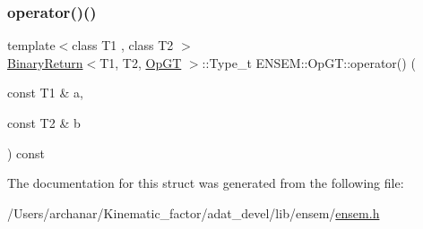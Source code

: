 \mbox{\label{structENSEM_1_1OpGT_acc420fbf856bae16d2db09a4c622ff4f}} 
\subsubsection{\texorpdfstring{operator()()}{operator()()}\hspace{0.1cm}{\footnotesize\ttfamily [2/2]}}
{\footnotesize\ttfamily template$<$class T1 , class T2 $>$ \\
\mbox{\hyperlink{structENSEM_1_1BinaryReturn}{Binary\+Return}}$<$T1, T2, \mbox{\hyperlink{structENSEM_1_1OpGT}{Op\+GT}} $>$\+::Type\+\_\+t E\+N\+S\+E\+M\+::\+Op\+G\+T\+::operator() (\begin{DoxyParamCaption}\item[{const T1 \&}]{a,  }\item[{const T2 \&}]{b }\end{DoxyParamCaption}) const\hspace{0.3cm}{\ttfamily [inline]}}



The documentation for this struct was generated from the following file\+:\begin{DoxyCompactItemize}
\item 
/\+Users/archanar/\+Kinematic\+\_\+factor/adat\+\_\+devel/lib/ensem/\mbox{\hyperlink{lib_2ensem_2ensem_8h}{ensem.\+h}}\end{DoxyCompactItemize}
